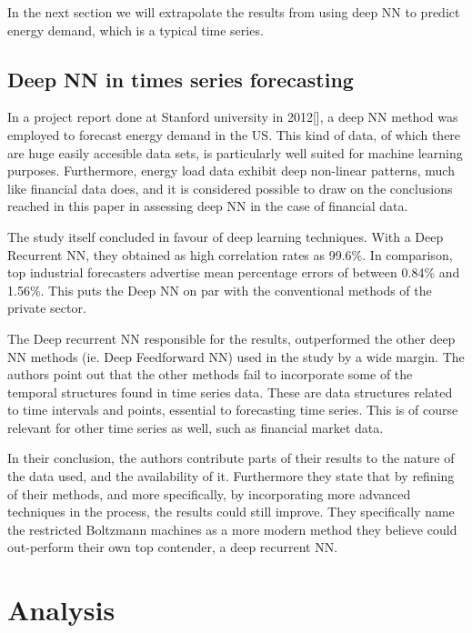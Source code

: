 In the next section we will extrapolate the results from using deep NN to predict energy demand, which is a typical time series.

\subsection{Deep NN in times series forecasting}

In a project report done at Stanford university in 2012[], a deep NN method was employed to forecast energy demand in the US. This kind of data, of which there are huge easily accesible data sets, is particularly well suited for machine learning purposes. Furthermore, energy load data exhibit deep non-linear patterns, much like financial data does, and it is considered possible to draw on the conclusions reached in this paper in assessing deep NN in the case of financial data.

The study itself concluded in favour of deep learning techniques. With a Deep Recurrent NN, they obtained as high correlation rates as 99.6\%. In comparison, top industrial forecasters advertise mean percentage errors of between 0.84\% and 1.56\%. This puts the Deep NN on par with the conventional methods of the private sector.

The Deep recurrent NN responsible for the results, outperformed the other deep NN methods (ie. Deep Feedforward NN) used in the study by a wide margin. The authors point out that the other methods fail to incorporate some of the temporal structures found in time series data. These are data structures related to time intervals and points, essential to forecasting time series. This is of course relevant for other time series as well, such as financial market data.

In their conclusion, the authors contribute parts of their results to the nature of the data used, and the availability of it. Furthermore they state that by refining of their methods, and more specifically, by incorporating more advanced techniques in the process, the results could still improve. They specifically name the restricted Boltzmann machines as a more modern method they believe could out-perform their own top contender, a deep recurrent NN.




\newpage

\section{Analysis}

